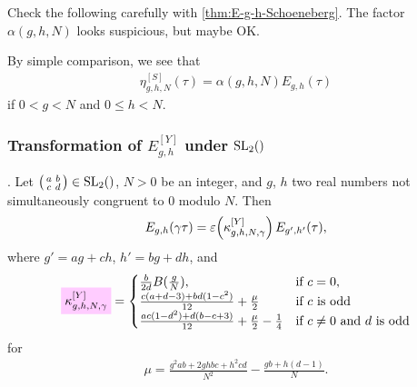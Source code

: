 \documentclass{article}
\begin{document}
\begin{Hemmecke}
\begin{Hemmecke}
  Check the following carefully with \ref{thm:E-g-h-Schoeneberg}.
  The factor $\alpha(g,h,N)$ looks suspicious, but maybe OK.
\end{Hemmecke}

By simple comparison, we see that
\begin{gather}
  \eta_{g,h,N}^{[S]}(\tau)
  =
  \alpha(g,h,N) E_{g,h}(\tau)
  \label{eq:eta_g-h-Schoeneberg-Yang}
\end{gather}
if $0<g<N$ and $0\le h<N$.






\subsubsection{Transformation of $E_{g,h}^{[Y]}$ under $\SL2Z$}

\begin{Lemma}[Yang]
  \cite[Theorem~1]{Yang_GeneralizedDedekindEtaFunctions_2004}.
  \label{thm:Generalized-Eta-Transformation-Yang}
  Let
  $\left(\begin{smallmatrix}a&b\\c&d\end{smallmatrix}\right) \in
  \SL2Z$, $N>0$ be an integer, and $g$, $h$ two real numbers not
  simultaneously congruent to 0 modulo $N$.
  Then
  \begin{gather*}
    E_{g,h}(\gamma\tau)
    =
    \varepsilon\!\left(\kappa_{g,h,N,\gamma}^{[Y]}\right)E_{g',h'}(\tau),
  \end{gather*}
  where $g'=ag+ch$, $h'=bg+dh$, and
  \begin{gather}
    \defineNotation[kappa-g-h-N-gamma-Yang]{\kappa_{g,h,N,\gamma}^{[Y]}}
    =
    \begin{cases}
      \frac{b}{2d} B(\frac{g}{N}), &\text{if $c=0$},
      \\
      \frac{c (a+d-3) + b d (1 - c^2)}{12} + \frac{\mu}{2}
      &
      \text{if $c$ is odd}
      \\
      \frac{a c (1 - d^2) + d (b - c + 3)}{12} + \frac{\mu}{2} - \frac{1}{4}
      &
      \text{if $c\not=0$ and $d$ is odd}
    \end{cases}
    \label{eq:kappa_g-h-N-gamma-Yang}
  \end{gather}
  for
  \begin{gather}
    \mu = \frac{g^2 a b + 2 g h b c + h^2 c d}{N^2}
             - \frac{g b + h (d-1)}{N}.
  \end{gather}
\end{Lemma}


\end{Hemmecke}
\end{document}
